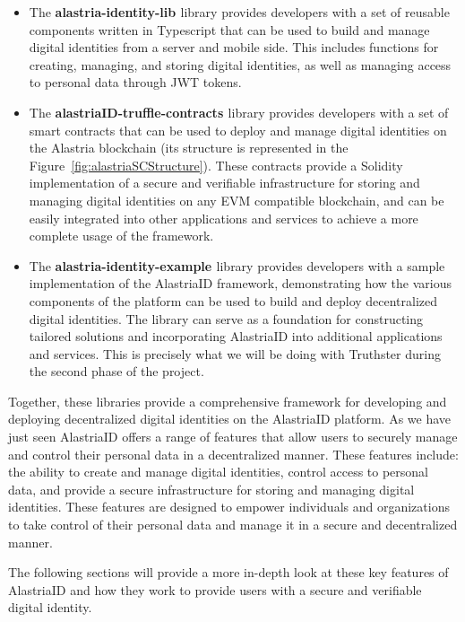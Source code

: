 \documentclass[target=mst,aauheader=]{thud}
\begin{document}
\begin{itemize}

    \item The \textbf{alastria-identity-lib \cite{alastriaIdentityLib}} library provides developers with a set of reusable components written in Typescript that can be used to build and manage digital identities from a server and mobile side. This includes functions for creating, managing, and storing digital identities, as well as managing access to personal data through JWT tokens.
    \item The \textbf{alastriaID-truffle-contracts \cite{alastriaSmartContracts}} library provides developers with a set of smart contracts that can be used to deploy and manage digital identities on the Alastria blockchain (its structure is represented in the Figure~\ref{fig:alastriaSCStructure}). These contracts provide a Solidity implementation of a secure and verifiable infrastructure for storing and managing digital identities on any EVM compatible blockchain, and can be easily integrated into other applications and services to achieve a more complete usage of the framework.
    \item The \textbf{alastria-identity-example \cite{alastriaIdentityExample}} library provides developers with a sample implementation of the AlastriaID framework, demonstrating how the various components of the platform can be used to build and deploy decentralized digital identities. The library can serve as a foundation for constructing tailored solutions and incorporating AlastriaID into additional applications and services. This is precisely what we will be doing with Truthster during the second phase of the project.

\end{itemize}

Together, these libraries provide a comprehensive framework for developing and deploying decentralized digital identities on the AlastriaID platform. 
As we have just seen AlastriaID offers a range of features that allow users to securely manage and control their personal data in a decentralized manner. These features include: the ability to create and manage digital identities, control access to personal data, and provide a secure infrastructure for storing and managing digital identities. These features are designed to empower individuals and organizations to take control of their personal data and manage it in a secure and decentralized manner.

The following sections will provide a more in-depth look at these key features of AlastriaID and how they work to provide users with a secure and verifiable digital identity.
\end{document}
